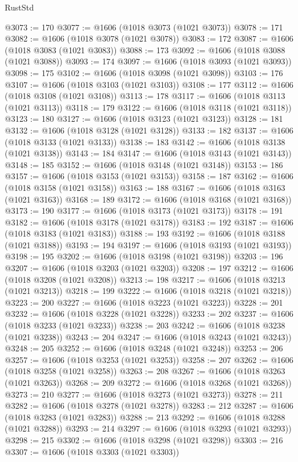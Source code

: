 \begin{lexlean}{RustStd}
\begin{coremodule}
@3073 := 170
@3077 := @1606 (@1018 @3073 (@1021 @3073))
@3078 := 171
@3082 := @1606 (@1018 @3078 (@1021 @3078))
@3083 := 172
@3087 := @1606 (@1018 @3083 (@1021 @3083))
@3088 := 173
@3092 := @1606 (@1018 @3088 (@1021 @3088))
@3093 := 174
@3097 := @1606 (@1018 @3093 (@1021 @3093))
@3098 := 175
@3102 := @1606 (@1018 @3098 (@1021 @3098))
@3103 := 176
@3107 := @1606 (@1018 @3103 (@1021 @3103))
@3108 := 177
@3112 := @1606 (@1018 @3108 (@1021 @3108))
@3113 := 178
@3117 := @1606 (@1018 @3113 (@1021 @3113))
@3118 := 179
@3122 := @1606 (@1018 @3118 (@1021 @3118))
@3123 := 180
@3127 := @1606 (@1018 @3123 (@1021 @3123))
@3128 := 181
@3132 := @1606 (@1018 @3128 (@1021 @3128))
@3133 := 182
@3137 := @1606 (@1018 @3133 (@1021 @3133))
@3138 := 183
@3142 := @1606 (@1018 @3138 (@1021 @3138))
@3143 := 184
@3147 := @1606 (@1018 @3143 (@1021 @3143))
@3148 := 185
@3152 := @1606 (@1018 @3148 (@1021 @3148))
@3153 := 186
@3157 := @1606 (@1018 @3153 (@1021 @3153))
@3158 := 187
@3162 := @1606 (@1018 @3158 (@1021 @3158))
@3163 := 188
@3167 := @1606 (@1018 @3163 (@1021 @3163))
@3168 := 189
@3172 := @1606 (@1018 @3168 (@1021 @3168))
@3173 := 190
@3177 := @1606 (@1018 @3173 (@1021 @3173))
@3178 := 191
@3182 := @1606 (@1018 @3178 (@1021 @3178))
@3183 := 192
@3187 := @1606 (@1018 @3183 (@1021 @3183))
@3188 := 193
@3192 := @1606 (@1018 @3188 (@1021 @3188))
@3193 := 194
@3197 := @1606 (@1018 @3193 (@1021 @3193))
@3198 := 195
@3202 := @1606 (@1018 @3198 (@1021 @3198))
@3203 := 196
@3207 := @1606 (@1018 @3203 (@1021 @3203))
@3208 := 197
@3212 := @1606 (@1018 @3208 (@1021 @3208))
@3213 := 198
@3217 := @1606 (@1018 @3213 (@1021 @3213))
@3218 := 199
@3222 := @1606 (@1018 @3218 (@1021 @3218))
@3223 := 200
@3227 := @1606 (@1018 @3223 (@1021 @3223))
@3228 := 201
@3232 := @1606 (@1018 @3228 (@1021 @3228))
@3233 := 202
@3237 := @1606 (@1018 @3233 (@1021 @3233))
@3238 := 203
@3242 := @1606 (@1018 @3238 (@1021 @3238))
@3243 := 204
@3247 := @1606 (@1018 @3243 (@1021 @3243))
@3248 := 205
@3252 := @1606 (@1018 @3248 (@1021 @3248))
@3253 := 206
@3257 := @1606 (@1018 @3253 (@1021 @3253))
@3258 := 207
@3262 := @1606 (@1018 @3258 (@1021 @3258))
@3263 := 208
@3267 := @1606 (@1018 @3263 (@1021 @3263))
@3268 := 209
@3272 := @1606 (@1018 @3268 (@1021 @3268))
@3273 := 210
@3277 := @1606 (@1018 @3273 (@1021 @3273))
@3278 := 211
@3282 := @1606 (@1018 @3278 (@1021 @3278))
@3283 := 212
@3287 := @1606 (@1018 @3283 (@1021 @3283))
@3288 := 213
@3292 := @1606 (@1018 @3288 (@1021 @3288))
@3293 := 214
@3297 := @1606 (@1018 @3293 (@1021 @3293))
@3298 := 215
@3302 := @1606 (@1018 @3298 (@1021 @3298))
@3303 := 216
@3307 := @1606 (@1018 @3303 (@1021 @3303))

\end{coremodule}
\end{lexlean}
